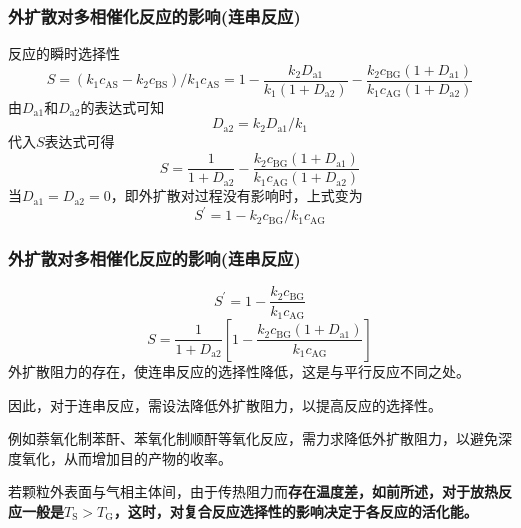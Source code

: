 \begin{frame}
    \frametitle{外扩散对多相催化反应的影响(连串反应)}

    反应的瞬时选择性
    \[
        S=\left(k_{1} c_{\mathrm{AS}}-k_{2} c_{\mathrm{BS}}\right) / k_{1} c_{\mathrm{AS}}=1-\frac{k_{2} D_{\mathrm{a} 1}}{k_{1}\left(1+D_{\mathrm{a} 2}\right)}-\frac{k_{2} c_{\mathrm{BG}}\left(1+D_{\mathrm{a} 1}\right)}{k_{1} c_{\mathrm{AG}}\left(1+D_{\mathrm{a} 2}\right)}
    \]
    由$D_{\mathrm{a} 1}$和$D_{\mathrm{a} 2}$的表达式可知
    \[
        D_{\mathrm{a} 2} = k_2 D_{\mathrm{a} 1}/k_1
    \]
    代入$S$表达式可得
    \[
        S=\frac{1}{1+D_{\mathrm{a} 2}}-\frac{k_{2} c_{\mathrm{BG}}\left(1+D_{\mathrm{a} 1}\right)}{k_{1} c_{\mathrm{AG}}\left(1+D_{\mathrm{a} 2}\right)} 
    \]
    当$D_{\mathrm{a} 1} = D_{\mathrm{a} 2} = 0$，即外扩散对过程没有影响时，上式变为
    \[
        S^{\prime}=1-k_{2} c_{\mathrm{BG}} / k_{1} c_{\mathrm{AG}}
    \]

\end{frame}


\begin{frame}
    \frametitle{外扩散对多相催化反应的影响(连串反应)}
    \[
        S^{\prime}=1-\frac{k_{2} c_{\mathrm{BG}}}{k_{1} c_{\mathrm{AG}}} 
    \]
    \[
        S=\frac{1}{1+D_{\mathrm{a} 2}}\left[ 1-\frac{k_{2} c_{\mathrm{BG}}\left(1+D_{\mathrm{a} 1}\right)}{k_{1} c_{\mathrm{AG}}} \right]
    \]
    外扩散阻力的存在，使连串反应的选择性降低，这是与平行反应不同之处。
    
    因此，对于连串反应，需设法降低外扩散阻力，以提高反应的选择性。
    
    例如萘氧化制苯酐、苯氧化制顺酐等氧化反应，需力求降低外扩散阻力，以避免深度氧化，从而增加目的产物的收率。

    若颗粒外表面与气相主体间，由于传热阻力而\bf{存在温度差}，如前所述，对于放热反应一般是$T_\mathrm{S} > T_\mathrm{G}$，这时，对复合反应选择性的影响决定于各反应的活化能。

\end{frame}



